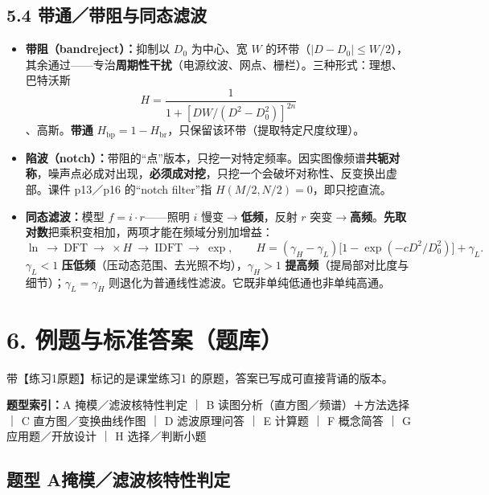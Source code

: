 \subsection*{5.4 带通／带阻与同态滤波}
\begin{itemize}
\item \textbf{带阻（bandreject）：}抑制以 $D_0$ 为中心、宽 $W$ 的环带（$|D-D_0|\le W/2$），其余通过——专治\textbf{周期性干扰}（电源纹波、网点、栅栏）。三种形式：理想、巴特沃斯
\[
H=\frac{1}{1+\left[DW/(D^2-D_0^2)\right]^{2n}}
\]
、高斯。\textbf{带通} $H_{\mathrm{bp}}=1-H_{\mathrm{br}}$，只保留该环带（提取特定尺度纹理）。
\item \textbf{陷波（notch）：}带阻的“点”版本，只挖一对特定频率。因实图像频谱\textbf{共轭对称}，噪声点必成对出现，\textbf{必须成对挖}，只挖一个会破坏对称性、反变换出虚部。课件 p13／p16 的“notch filter”指 $H(M/2,N/2)=0$，即只挖直流。
\item \textbf{同态滤波：}模型 $f=i\cdot r$——照明 $i$ 慢变$\to$\textbf{低频}，反射 $r$ 突变$\to$\textbf{高频}。\textbf{先取对数}把乘积变相加，两项才能在频域分别加增益：
\[
\ln\ \to\ \mathrm{DFT}\ \to\ \times H\ \to\ \mathrm{IDFT}\ \to\ \exp,
\qquad
H=(\gamma_H-\gamma_L)\bigl[1-\exp(-cD^2/D_0^2)\bigr]+\gamma_L.
\]
$\gamma_L<1$ \textbf{压低频}（压动态范围、去光照不均），$\gamma_H>1$ \textbf{提高频}（提局部对比度与细节）；$\gamma_L=\gamma_H$ 则退化为普通线性滤波。它既非单纯低通也非单纯高通。
\end{itemize}

\section*{6. 例题与标准答案（题库）}
带【练习1原题】标记的是课堂练习1 的原题，答案已写成可直接背诵的版本。

\noindent\textbf{题型索引：}A 掩模／滤波核特性判定 ｜ B 读图分析（直方图／频谱）＋方法选择 ｜ C 直方图／变换曲线作图 ｜ D 滤波原理问答 ｜ E 计算题 ｜ F 概念简答 ｜ G 应用题／开放设计 ｜ H 选择／判断小题

\subsection*{题型 A\quad 掩模／滤波核特性判定}
